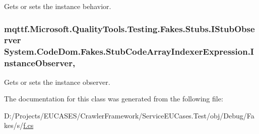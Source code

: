 Gets or sets the instance behavior.

\hypertarget{class_system_1_1_code_dom_1_1_fakes_1_1_stub_code_array_indexer_expression_af7decab22b450d53219a32f5c72fffd0}{
\subsubsection[{Instance\-Observer}]{\setlength{\rightskip}{0pt plus 5cm}mqttf.\-Microsoft.\-Quality\-Tools.\-Testing.\-Fakes.\-Stubs.\-I\-Stub\-Observer System.\-Code\-Dom.\-Fakes.\-Stub\-Code\-Array\-Indexer\-Expression.\-Instance\-Observer\hspace{0.3cm}{\ttfamily [get]}, {\ttfamily [set]}}}\label{class_system_1_1_code_dom_1_1_fakes_1_1_stub_code_array_indexer_expression_af7decab22b450d53219a32f5c72fffd0}


Gets or sets the instance observer.



The documentation for this class was generated from the following file\-:\begin{DoxyCompactItemize}
\item 
D\-:/\-Projects/\-E\-U\-C\-A\-S\-E\-S/\-Crawler\-Framework/\-Service\-E\-U\-Cases.\-Test/obj/\-Debug/\-Fakes/s/\hyperlink{s_2f_8cs}{f.\-cs}\end{DoxyCompactItemize}

